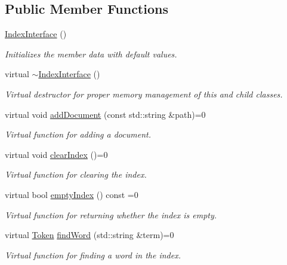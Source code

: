\subsection*{Public Member Functions}
\begin{DoxyCompactItemize}
\item 
\hyperlink{class_index_interface_a7b1e7eae7faa652d2f63efeecf0ca2de}{Index\+Interface} ()
\begin{DoxyCompactList}\small\item\em Initializes the member data with default values. \end{DoxyCompactList}\item 
virtual \hyperlink{class_index_interface_a3927fabe77a7da5845dc0495b2c1c2b2}{$\sim$\+Index\+Interface} ()
\begin{DoxyCompactList}\small\item\em Virtual destructor for proper memory management of this and child classes. \end{DoxyCompactList}\item 
virtual void \hyperlink{class_index_interface_aa7601d76e8cc3f0657e800efdc4c127e}{add\+Document} (const std\+::string \&path)=0
\begin{DoxyCompactList}\small\item\em Virtual function for adding a document. \end{DoxyCompactList}\item 
virtual void \hyperlink{class_index_interface_aac36b4561598ee84c0c68958a1e3f82b}{clear\+Index} ()=0
\begin{DoxyCompactList}\small\item\em Virtual function for clearing the index. \end{DoxyCompactList}\item 
virtual bool \hyperlink{class_index_interface_aaf90058a62e096bf607ea3dec2545ee4}{empty\+Index} () const  =0
\begin{DoxyCompactList}\small\item\em Virtual function for returning whether the index is empty. \end{DoxyCompactList}\item 
virtual \hyperlink{class_token}{Token} \hyperlink{class_index_interface_aa0ea18e7daa9984240d108bd765b2816}{find\+Word} (std\+::string \&term)=0
\begin{DoxyCompactList}\small\item\em Virtual function for finding a word in the index. \end{DoxyCompactList}\item 

\end{DoxyCompactItemize}
